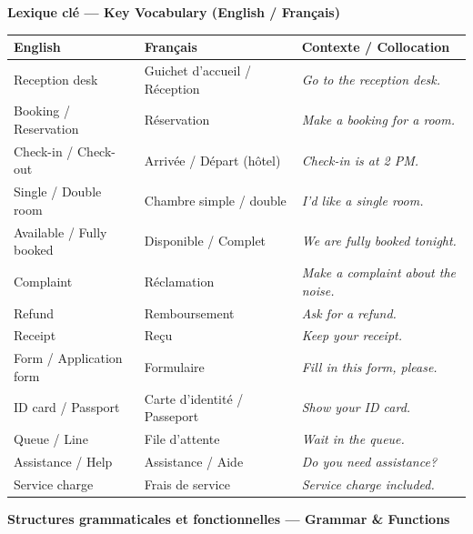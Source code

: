 \documentclass[11pt]{article}
\newcommand{\cle}[1]{{\popxbold\color{popdark}#1}}
\newcommand{\eng}[1]{\ifmmode\text{\textit{#1}}\else\begingroup\selectlanguage{english}\itshape #1\endgroup\fi}
\begin{document}
\begin{bilan}

\textbf{Lexique clé — Key Vocabulary (English / Français)}

\begin{center}
\begin{tabularx}{\linewidth}{|X|X|X|}
\hline
\rowcolor{popblueL} \textbf{English} & \textbf{Français} & \textbf{Contexte / Collocation} \\
\hline
\cle{Reception desk} & Guichet d'accueil / Réception & \eng{Go to the reception desk.} \\
\cle{Booking / Reservation} & Réservation & \eng{Make a booking for a room.} \\
\cle{Check-in / Check-out} & Arrivée / Départ (hôtel) & \eng{Check-in is at 2 PM.} \\
\cle{Single / Double room} & Chambre simple / double & \eng{I'd like a single room.} \\
\cle{Available / Fully booked} & Disponible / Complet & \eng{We are fully booked tonight.} \\
\cle{Complaint} & Réclamation & \eng{Make a complaint about the noise.} \\
\cle{Refund} & Remboursement & \eng{Ask for a refund.} \\
\cle{Receipt} & Reçu & \eng{Keep your receipt.} \\
\cle{Form / Application form} & Formulaire & \eng{Fill in this form, please.} \\
\cle{ID card / Passport} & Carte d'identité / Passeport & \eng{Show your ID card.} \\
\cle{Queue / Line} & File d'attente & \eng{Wait in the queue.} \\
\cle{Assistance / Help} & Assistance / Aide & \eng{Do you need assistance?} \\
\cle{Service charge} & Frais de service & \eng{Service charge included.} \\
\hline
\end{tabularx}
\end{center}

\vspace{0.5cm}

\textbf{Structures grammaticales et fonctionnelles — Grammar \& Functions}


\end{bilan}
\end{document}
